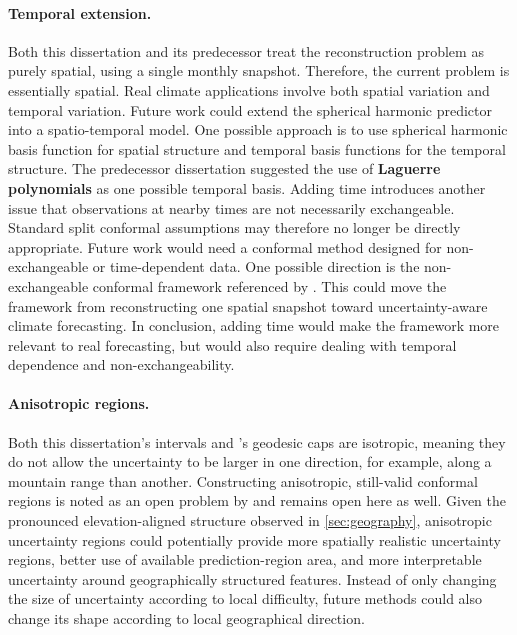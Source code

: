 \paragraph{Temporal extension.} Both this dissertation and its predecessor treat the reconstruction problem as purely spatial, using a single monthly snapshot. Therefore, the current problem is essentially spatial. Real climate applications involve both spatial variation and temporal variation. Future work could extend the spherical harmonic predictor into a spatio-temporal model. One possible approach is to use spherical harmonic basis function for spatial structure and temporal basis functions for the temporal structure. The predecessor dissertation suggested the use of \textbf{Laguerre polynomials} as one possible temporal basis. Adding time introduces another issue that observations at nearby times are not necessarily exchangeable. Standard split conformal assumptions may therefore no longer be directly appropriate. Future work would need a conformal method designed for non-exchangeable or time-dependent data. One possible direction is the non-exchangeable conformal framework referenced by \citeauthor{amirishahbazi2026}. This could move the framework from reconstructing one spatial snapshot toward uncertainty-aware climate forecasting. In conclusion, adding time would make the framework more relevant to real forecasting, but would also require dealing with temporal dependence and non-exchangeability.

\paragraph{Anisotropic regions.} Both this dissertation's intervals and \citeauthor{amirishahbazi2026}'s geodesic caps are isotropic, meaning they do not allow the uncertainty to be larger in one direction, for example, along a mountain range than another. Constructing anisotropic, still-valid conformal regions is noted as an open problem by \citeauthor{amirishahbazi2026} and remains open here as well. Given the pronounced elevation-aligned structure observed in \cref{sec:geography}, anisotropic uncertainty regions could potentially provide more spatially realistic uncertainty regions, better use of available prediction-region area, and more interpretable uncertainty around geographically structured features. Instead of only changing the size of uncertainty according to local difficulty, future methods could also change its shape according to local geographical direction.

